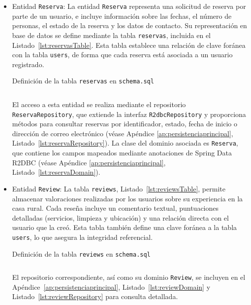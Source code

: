 \begin{itemize}
    \item Entidad \texttt{Reserva}: La entidad \texttt{Reserva} representa una solicitud de reserva por parte de un usuario, e incluye información sobre las fechas, el número de personas, el estado de la reserva y los datos de contacto. Su representación en base de datos se define mediante la tabla \texttt{reservas}, incluida en el Listado~\ref{lst:reservasTable}. Esta tabla establece una relación de clave foránea con la tabla \texttt{users}, de forma que cada reserva está asociada a un usuario registrado.
  \begin{longlisting}
        \caption{Definición de la tabla \texttt{reservas} en {\tt schema.sql}}
        \inputminted[firstline=42,lastline=55]{sql}{../backend/elrincondeeva/elrincondeeva/src/main/resources/schema.sql}
        \label{lst:reservasTable}
    \end{longlisting}
    El acceso a esta entidad se realiza mediante el repositorio \texttt{ReservaRepository}, que extiende la interfaz \texttt{R2dbcRepository} y proporciona métodos para consultar reservas por identificador, estado, fecha de inicio o dirección de correo electrónico (véase Apéndice \ref{ap:persistenciaprincipal}, Listado~\ref{lst:reservaRepository}). La clase del dominio asociada es \texttt{Reserva}, que contiene los campos mapeados mediante anotaciones de Spring Data R2DBC (véase Apéndice \ref{ap:persistenciaprincipal}, Listado~\ref{lst:reservaDomain}).
    
    
    \item Entidad \texttt{Review}: La tabla \texttt{reviews}, Listado~\ref{lst:reviewsTable}, permite almacenar valoraciones realizadas por los usuarios sobre su experiencia en la casa rural. Cada reseña incluye un comentario textual, puntuaciones detalladas (servicios, limpieza y ubicación) y una relación directa con el usuario que la creó. Esta tabla también define una clave foránea a la tabla \texttt{users}, lo que asegura la integridad referencial.
     \begin{longlisting}
        \caption{Definición de la tabla \texttt{reviews} en {\tt schema.sql}}
        \inputminted[firstline=30,lastline=40]{sql}{../backend/elrincondeeva/elrincondeeva/src/main/resources/schema.sql}
        \label{lst:reviewsTable}
    \end{longlisting}
    El repositorio correspondiente, así como su dominio \texttt{Review}, se incluyen en el Apéndice~\ref{ap:persistenciaprincipal}, Listado~\ref{lst:reviewDomain} y Listado~\ref{lst:reviewRepository} para consulta detallada.
    

\end{itemize}
